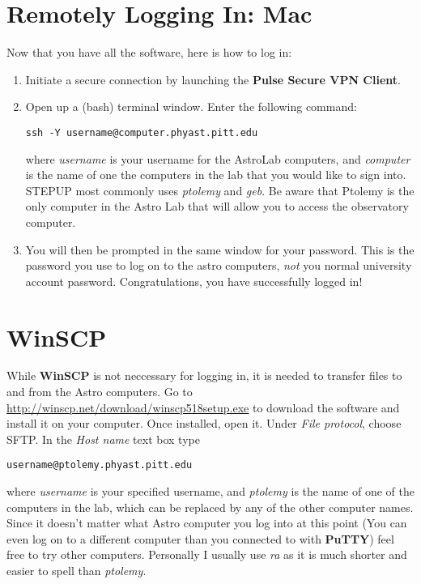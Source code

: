 \documentclass[11pt]{article}
\begin{document}
\section{Remotely Logging In: Mac}
Now that you have all the software, here is how to log in:
\begin{enumerate}
\item Initiate a secure connection by launching the \textbf{Pulse Secure VPN Client}.

\item Open up a (bash) terminal window. Enter the following command:

\begin{verbatim}
ssh -Y username@computer.phyast.pitt.edu
\end{verbatim}

where \emph{username} is your username for the AstroLab computers, and \emph{computer} is the name of one the computers in the lab that you would like to sign into. STEPUP most commonly uses \emph{ptolemy} and \emph{geb}. Be aware that Ptolemy is the only computer in the Astro Lab that will allow you to access the observatory computer.

\item You will then be prompted in the same window for your password. This is the password you use to log on to the astro computers, \emph{not} you normal university account password. Congratulations, you have successfully logged in!
\end{enumerate}

\section{WinSCP}
While \textbf{WinSCP} is not neccessary for logging in, it is needed to transfer files to and from the Astro computers. Go to \url{http://winscp.net/download/winscp518setup.exe} to download the software and install it on your computer. Once installed, open it. Under \emph{File protocol}, choose SFTP. In the \emph{Host name} text box type 

\begin{verbatim}
username@ptolemy.phyast.pitt.edu
\end{verbatim}
where \emph{username} is your specified username, and \emph{ptolemy} is the name of one of the computers in the lab, which can be replaced by any of the other computer names. Since it doesn't matter what Astro computer you log into at this point (You can even log on to a different computer than you connected to with \textbf{PuTTY}) feel free to try other computers. Personally I usually use \emph{ra} as it is much shorter and easier to spell than \emph{ptolemy}. 
\end{document}
